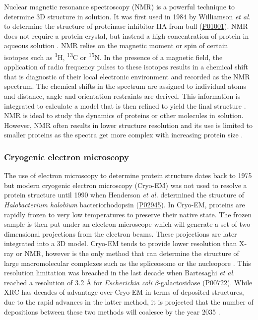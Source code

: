 Nuclear magnetic resonance spectroscopy (NMR) is a powerful technique to determine 3D structure in solution. It was first used in 1984 by Williamson \textit{et al.} \cite{WILLIAMSON_1985_NMR} to determine the structure of proteinase inhibitor IIA from bull (\href{https://www.uniprot.org/uniprotkb/P01001/entry}{P01001}). NMR does not require a protein crystal, but instead a high concentration of protein in aqueous solution \cite{WUTHRICH_1982_NMR}. NMR relies on the magnetic moment or spin of certain isotopes such as \textsuperscript{1}H, \textsuperscript{13}C or \textsuperscript{15}N. In the presence of a magnetic field, the application of radio frequency pulses to these isotopes results in a chemical shift that is diagnostic of their local electronic environment and recorded as the NMR spectrum. The chemical shifts in the spectrum are assigned to individual atoms and distance, angle and orientation restraints are derived. This information is integrated to calculate a model that is then refined to yield the final structure \cite{WUTHRICH_1984_NMR}. NMR is ideal to study the dynamics of proteins or other molecules in solution. However, NMR often results in lower structure resolution and its use is limited to smaller proteins as the spectra get more complex with increasing protein size \cite{EMWAS_2015_NMR}.

\subsubsection{Cryogenic electron microscopy}

The use of electron microscopy to determine protein structure dates back to 1975 \cite{HENDERSON_1975_EM} but modern cryogenic electron microscopy (Cryo-EM) was not used to resolve a protein structure until 1990 when Henderson \textit{et al.} \cite{HENDERSON_1990_CRYOEM} determined the structure of \textit{Halobacterium halobium} bacteriorhodopsin (\href{https://www.uniprot.org/uniprotkb/P02945/entry}{P02945}). In Cryo-EM, proteins are rapidly frozen to very low temperatures to preserve their native state. The frozen sample is then put under an electron microscope which will generate a set of two-dimensional projections from the electron beams. These projections are later integrated into a 3D model. Cryo-EM tends to provide lower resolution than X-ray or NMR, however is the only method that can determine the structure of large macromolecular complexes such as the spliceosome \cite{CHUANGYE_2016_SPLICEOSOME} or the nucleopore \cite{KOSINSKI_2016_NUCLEOPORE}. This resolution limitation was breached in the last decade when Bartesaghi \textit{et al.} \cite{BARTESAGHI_2014_CRYOEM} reached a resolution of 3.2 \AA{} for \textit{Escherichia coli} $\beta$-galactosidase (\href{https://www.uniprot.org/uniprotkb/P00722/entry}{P00722}). While XRC has decades of advantage over Cryo-EM in terms of deposited structures, due to the rapid advances in the latter method, it is projected that the number of depositions between these two methods will coalesce by the year 2035 \cite{CHIU_2021_CRYOEM}.

